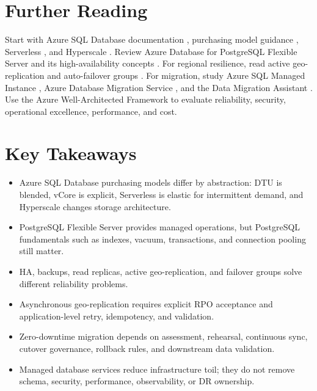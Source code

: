 \section{Further Reading}
Start with Azure SQL Database documentation \cite{microsoft2025azuresqldb}, purchasing model guidance \cite{microsoft2025sqldbPurchasing}, Serverless \cite{microsoft2025sqlServerless}, and Hyperscale \cite{microsoft2025sqlHyperscale}. Review Azure Database for PostgreSQL Flexible Server \cite{microsoft2025postgresflexible} and its high-availability concepts \cite{microsoft2025postgresHA}. For regional resilience, read active geo-replication \cite{microsoft2025activeGeoReplication} and auto-failover groups \cite{microsoft2025failoverGroups}. For migration, study Azure SQL Managed Instance \cite{microsoft2025sqlmi}, Azure Database Migration Service \cite{microsoft2025dms}, and the Data Migration Assistant \cite{microsoft2025dma}. Use the Azure Well-Architected Framework \cite{microsoft2025wellarchitected} to evaluate reliability, security, operational excellence, performance, and cost.

\section*{Key Takeaways}
\begin{itemize}
    \item Azure SQL Database purchasing models differ by abstraction: DTU is blended, vCore is explicit, Serverless is elastic for intermittent demand, and Hyperscale changes storage architecture.
    \item PostgreSQL Flexible Server provides managed operations, but PostgreSQL fundamentals such as indexes, vacuum, transactions, and connection pooling still matter.
    \item HA, backups, read replicas, active geo-replication, and failover groups solve different reliability problems.
    \item Asynchronous geo-replication requires explicit RPO acceptance and application-level retry, idempotency, and validation.
    \item Zero-downtime migration depends on assessment, rehearsal, continuous sync, cutover governance, rollback rules, and downstream data validation.
    \item Managed database services reduce infrastructure toil; they do not remove schema, security, performance, observability, or DR ownership.
\end{itemize}

